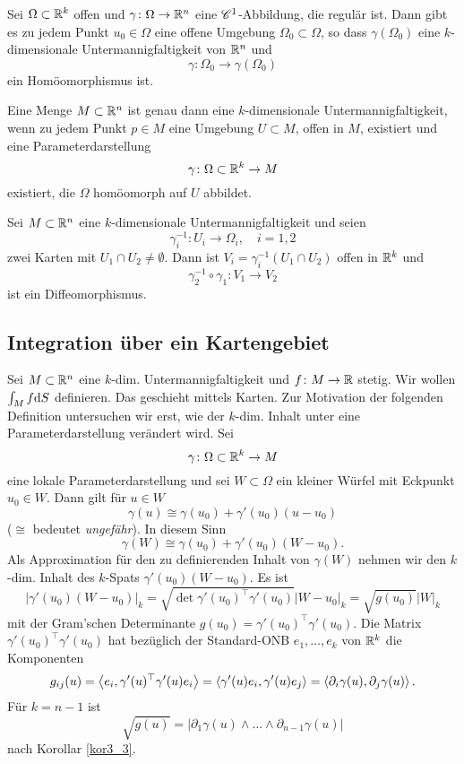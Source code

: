 \begin{satz}\label{satz3_5}
	Sei $\Omega \subset \mathbb{R}^k$ offen und $\gamma \colon \Omega \to \mathbb{R}^n$ eine $\mathscr{C}^1$-Abbildung, die regulär ist. Dann gibt es zu jedem Punkt $u_0 \in \Omega$ eine offene Umgebung $\Omega_0 \subset \Omega$, so dass $\gamma(\Omega_0)$ eine $k$-dimensionale Untermannigfaltigkeit von $\mathbb{R}^n$ und
	\[\gamma \colon \Omega_0 \to \gamma(\Omega_0)\]
	ein Homöomorphismus ist.	
\end{satz}
\begin{thm}\label{thm3_6}
	Eine Menge $M \subset \mathbb{R}^n$ ist genau dann eine $k$-dimensionale Untermannigfaltigkeit, wenn zu jedem Punkt $p \in M$ eine Umgebung $U \subset M$, offen in $M$, existiert und eine Parameterdarstellung
	\[\gamma \colon \Omega \subset \mathbb{R}^k \to M\]
	existiert, die $\Omega$ homöomorph auf $U$ abbildet.
\end{thm}
\begin{satz}\label{satz3_7}
	Sei $M \subset \mathbb{R}^n$ eine $k$-dimensionale Untermannigfaltigkeit und seien
	\[\gamma_i^{-1} \colon U_i \to \Omega_i, \quad i = 1,2\]
	zwei Karten mit $U_1 \cap U_2 \neq \emptyset$. Dann ist $V_i = \gamma_i^{-1}(U_1 \cap U_2)$ offen in $\mathbb{R}^k$ und
	\[\gamma_2^{-1} \circ \gamma_1 \colon V_1 \to V_2\]
	ist ein Diffeomorphismus.
\end{satz}

\subsection{Integration über ein Kartengebiet}
Sei $M \subset \mathbb{R}^n$ eine $k$-dim. Untermannigfaltigkeit und $f \colon M \to \mathbb{R}$ stetig. Wir wollen $\int_M f \mathrm{d} S$ definieren. Das geschieht mittels Karten. Zur Motivation der folgenden Definition untersuchen wir erst, wie der $k$-dim. Inhalt unter eine Parameterdarstellung verändert wird. Sei 
\[\gamma \colon \Omega \subset \mathbb{R}^k \to M\]
eine lokale Parameterdarstellung und sei $W \subset \Omega$ ein kleiner Würfel mit Eckpunkt $u_0 \in W$. Dann gilt für $u \in W$
\[\gamma(u) \cong \gamma(u_0) + \gamma'(u_0)(u-u_0)\]
($\cong$ bedeutet \textit{ungefähr}). In diesem Sinn
\[\gamma(W) \cong \gamma(u_0) + \gamma'(u_0) (W - u_0).\]
Als Approximation für den zu definierenden Inhalt von $\gamma(W)$ nehmen wir den $k$-dim. Inhalt des $k$-Spats $\gamma'(u_0)(W - u_0)$. Es ist
\[|\gamma'(u_0)(W- u_0)|_k = \sqrt{\det \gamma'(u_0)^\top \gamma'(u_0)} |W - u_0|_k = \sqrt{g(u_0)} |W|_k\]
mit der Gram'schen Determinante $g(u_0) =  \gamma'(u_0)^\top \gamma'(u_0)$. Die Matrix $ \gamma'(u_0)^\top \gamma'(u_0)$ hat bezüglich der Standard-ONB $e_1, \dots, e_k$ von $\mathbb{R}^k$ die Komponenten
\[g_{ij}(u) = \left\langle e_i,\gamma'(u)^\top \gamma'(u) e_i \right\rangle = \left\langle\gamma'(u)e_i,\gamma'(u)e_j \right\rangle = \left\langle\partial_i \gamma(u),\partial_j \gamma(u) \right\rangle.\]
Für $k = n-1$ ist
\[\sqrt{g(u)} = |\partial_1 \gamma(u) \wedge \dots \wedge \partial_{n-1} \gamma(u)|\]
nach Korollar \ref{kor3_3}. 

